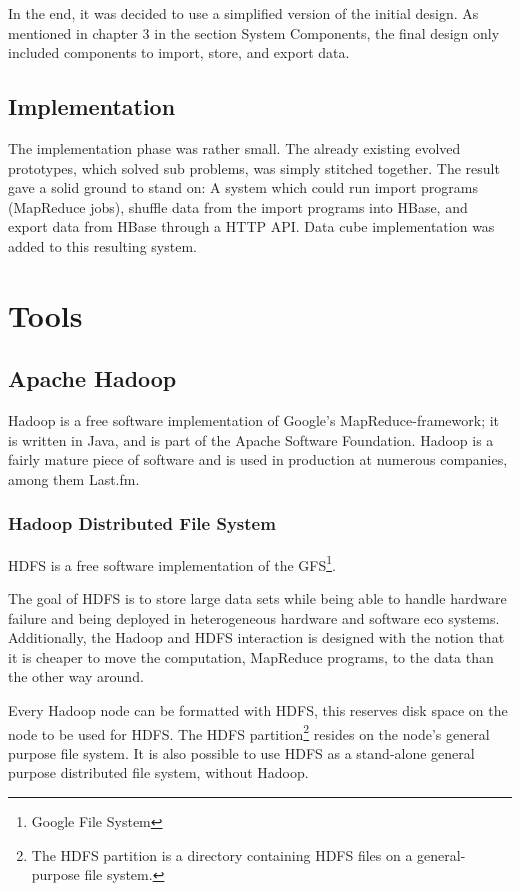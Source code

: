 In the end, it was decided to use a simplified version of the initial design.
As mentioned in chapter 3 in the section System Components, the final design
only included components to import, store, and export data.


\subsection*{Implementation}

The implementation phase was rather small. The already existing evolved
prototypes, which solved sub problems, was simply stitched together. The result
gave a solid ground to stand on: A system which could run import programs
(MapReduce jobs), shuffle data from the import programs into HBase, and export
data from HBase through a HTTP API. Data cube implementation was added to this
resulting system.


\section{Tools}

\subsection{Apache Hadoop}

Hadoop is a free software implementation of Google's MapReduce-framework; it is
written in Java, and is part of the Apache Software Foundation. Hadoop is a
fairly mature piece of software and is used in production at numerous companies,
among them Last.fm. \cite{hadoop}


\subsubsection{Hadoop Distributed File System}

HDFS is a free software implementation of the GFS\footnote{Google File System}.
\cite{gfs}

The goal of HDFS is to store large data sets while being able to handle
hardware failure and being deployed in heterogeneous hardware and software
eco systems. Additionally, the Hadoop and HDFS interaction is designed with
the notion that it is cheaper to move the computation, MapReduce programs,
to the data than the other way around.

Every Hadoop node can be formatted with HDFS, this reserves disk space on the
node to be used for HDFS. The HDFS partition\footnote{The HDFS partition is a
directory containing HDFS files on a general-purpose file system.} resides on
the node's general purpose file system. It is also possible to use HDFS as a
stand-alone general purpose distributed file system, without Hadoop.

